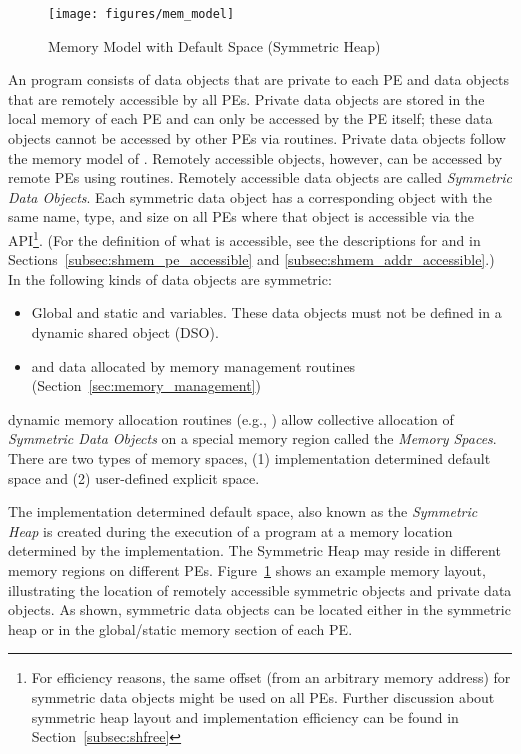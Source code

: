 \begin{figure}[h]
\texttt{[image: figures/mem\_model]}
\caption{\openshmem Memory Model with Default Space (Symmetric Heap)}
\label{fig:mem_model}
\end{figure}
%
An \openshmem program consists of data objects that are private to each \ac{PE}
and data  objects that are remotely accessible by all \acp{PE}. Private data
objects are stored in the local memory of each \ac{PE} and can only be accessed
by the \ac{PE} itself; these data objects cannot be accessed by other \acp{PE}
via \openshmem routines. Private data objects follow the memory model of
\Cstd. Remotely accessible objects, however, can be accessed by
remote \acp{PE} using \openshmem routines.  Remotely accessible data objects are
called \emph{Symmetric Data Objects}.  Each symmetric data object has a
corresponding object with the same name, type, and size on all \acp{PE} where
that object is accessible via the \openshmem \ac{API}\footnote{For efficiency
reasons, the same offset (from an arbitrary memory address) for symmetric data
objects might be used on all \acp{PE}. Further discussion about symmetric heap
layout and implementation efficiency can be found in Section~\ref{subsec:shfree}}.
(For the definition of what is accessible, see the descriptions for
 and 
in Sections~\ref{subsec:shmem_pe_accessible} and
\ref{subsec:shmem_addr_accessible}.) In \openshmem the following kinds of data
objects are symmetric:
%
\begin{itemize}
\item Global and static \Cstd and \Cpp variables. These data objects must
  not be defined in a dynamic shared object (DSO).
\item \Cstd and \Cpp data allocated by \openshmem memory management routines
  (Section~\ref{sec:memory_management})
\end{itemize}

\openshmem dynamic memory allocation routines (e.g.,
) allow collective allocation of \emph{Symmetric Data
Objects} on a special memory region called the \emph{Memory Spaces}. There are
two types of memory spaces, (1) implementation determined default space and
(2) user-defined explicit space.

The implementation determined default space, also known as the \emph{Symmetric
Heap} is created during the execution of a program at a memory location
determined by the implementation. The Symmetric Heap may reside in different
memory regions on different \acp{PE}. Figure~\ref{fig:mem_model} shows an
example \openshmem memory layout, illustrating the location of remotely
accessible symmetric objects and private data objects. As shown, symmetric data
objects can be located either in the symmetric heap or in the global/static
memory section of each \ac{PE}.

